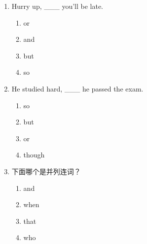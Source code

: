\documentclass[11pt,a4paper]{ctexart}
\begin{document}
\begin{enumerate}[leftmargin=*,itemsep=4pt]
\begin{enumerate}[label=\Alph*.,leftmargin=2em,itemsep=1pt,topsep=2pt]
\item because
\item if
\item that
\end{enumerate}
\item Hurry up, \_\_\_ you’ll be late.
\begin{enumerate}[label=\Alph*.,leftmargin=2em,itemsep=1pt,topsep=2pt]
\item or
\item and
\item but
\item so
\end{enumerate}
\item He studied hard, \_\_\_ he passed the exam.
\begin{enumerate}[label=\Alph*.,leftmargin=2em,itemsep=1pt,topsep=2pt]
\item so
\item but
\item or
\item though
\end{enumerate}
\item 下面哪个是并列连词？
\begin{enumerate}[label=\Alph*.,leftmargin=2em,itemsep=1pt,topsep=2pt]
\item and
\item when
\item that
\item who
\end{enumerate}
\end{enumerate}
\end{document}
